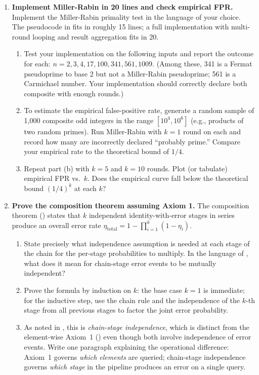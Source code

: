 \begin{enumerate}
\item \exstarstar
\textbf{Implement Miller-Rabin in 20 lines and check empirical FPR.}
Implement the Miller-Rabin primality test in the language of your choice.
The pseudocode in  fits in roughly 15 lines; a
full implementation with multi-round looping and result aggregation fits
in 20.
\begin{enumerate}
  \item[(a)] Test your implementation on the following inputs and report the
    outcome for each: $n = 2, 3, 4, 17, 100, 341, 561, 1009$.
    (Among these, 341 is a Fermat pseudoprime to base 2 but not a Miller-Rabin
    pseudoprime; 561 is a Carmichael number.
    Your implementation should correctly declare both composite with enough rounds.)
  \item[(b)] To estimate the empirical false-positive rate, generate a random
    sample of 1{,}000 composite odd integers in the range $[10^4, 10^6]$
    (e.g., products of two random primes). Run Miller-Rabin with $k = 1$
    round on each and record how many are incorrectly declared ``probably prime.''
    Compare your empirical rate to the theoretical bound of $1/4$.
  \item[(c)] Repeat part (b) with $k = 5$ and $k = 10$ rounds. Plot (or tabulate)
    empirical FPR vs.\ $k$. Does the empirical curve fall below the theoretical
    bound $(1/4)^k$ at each $k$?
\end{enumerate}

\item \exstarstar
\textbf{Prove the composition theorem assuming Axiom 1.}
The composition theorem () states that $k$ independent
identity-with-error stages in series produce an overall error rate
$\eta_{\mathrm{total}} = 1 - \prod_{i=1}^{k}(1 - \eta_i)$.
\begin{enumerate}
  \item[(a)] State precisely what independence assumption is needed at each
    stage of the chain for the per-stage probabilities to multiply. In the
    language of , what does it mean for chain-stage error
    events to be mutually independent?
  \item[(b)] Prove the formula by induction on $k$: the base case $k = 1$ is
    immediate; for the inductive step, use the chain rule and the
    independence of the $k$-th stage from all previous stages to factor
    the joint error probability.
  \item[(c)] As noted in , this is
    \emph{chain-stage independence}, which is distinct from the element-wise
    Axiom~1 () even though both involve independence
    of error events. Write one paragraph explaining the operational difference:
    Axiom~1 governs \emph{which elements} are queried; chain-stage independence
    governs \emph{which stage} in the pipeline produces an error on a single
    query.
\end{enumerate}


\end{enumerate}
